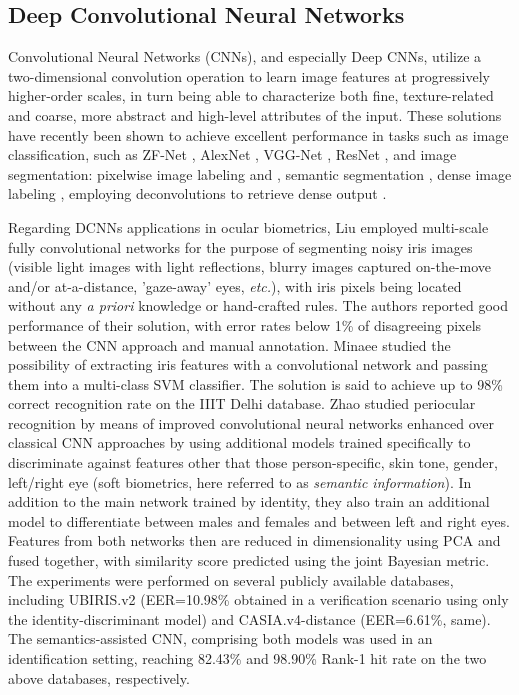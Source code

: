 \documentclass[10pt,twocolumn,letterpaper]{article}
\begin{document}
\subsection{Deep Convolutional Neural Networks}
Convolutional Neural Networks (CNNs), and especially Deep CNNs, utilize a two-dimensional convolution operation to learn image features at progressively higher-order scales, in turn being able to characterize both fine, texture-related and coarse, more abstract and high-level attributes of the input. These solutions have recently been shown to achieve excellent performance in tasks such as image classification, such as ZF-Net \cite{ZFNet2013}, AlexNet \cite{AlexNet2014}, VGG-Net \cite{VGGSimonyanCNNsForRecognition2014}, ResNet \cite{ResNet2013}, and image segmentation: pixelwise image labeling \cite{LiPixelwiseClassificationCNNs2014} and \cite{PinheiroPixelWiseLabelingCNNs2015}, semantic segmentation  \cite{YuCNNsForSemanticSegmentationARXIV2016}\cite{WuCNNsForSemanticSegmentation2014}, dense image labeling  \cite{IslamDenseImageLabelingCNNs2016}, employing deconvolutions to retrieve dense output \cite{NohDeconvolutionNNsForSegmentation2015}. 

Regarding DCNNs applications in ocular biometrics, Liu \etal \cite{LiuICB2016CNNsForIrisSegmentation} employed multi-scale fully convolutional networks for the purpose of segmenting noisy iris images (\eg visible light images with light reflections, blurry images captured on-the-move and/or at-a-distance, 'gaze-away' eyes, \emph{etc.}), with iris pixels being located without any \emph{a priori} knowledge or hand-crafted rules. The authors reported good performance of their solution, with error rates below 1\% of disagreeing pixels between the CNN approach and manual annotation. Minaee \etal \cite{MinaeeCNNforIrisRec2016} studied the possibility of extracting iris features with a convolutional network and passing them into a multi-class SVM classifier. The solution is said to achieve up to 98\% correct recognition rate on the IIIT Delhi database. Zhao \etal \cite{ZhaoKumarCNNsForPeriocularTIFS2016} studied periocular recognition by means of improved convolutional neural networks enhanced over classical CNN approaches by using additional models trained specifically to discriminate against features other that those person-specific, \eg skin tone, gender, left/right eye (soft biometrics, here referred to as \emph{semantic information}). In addition to the main network trained by identity, they also train an additional model to differentiate between males and females and between left and right eyes. Features from both networks then are reduced in dimensionality using PCA and fused together, with similarity score predicted using the joint Bayesian metric. The experiments were performed on several publicly available databases, including UBIRIS.v2 (EER=10.98\% obtained in a verification scenario using only the identity-discriminant model) and CASIA.v4-distance (EER=6.61\%, same). The semantics-assisted CNN, comprising both models was used in an identification setting, reaching 82.43\% and 98.90\% Rank-1 hit rate on the two above databases, respectively.   
\end{document}
